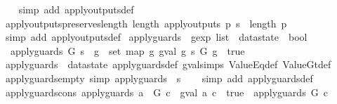 \begin{isabellebody}
%
\isadelimproof
\ \ %
\endisadelimproof
%
\isatagproof
{}\isamarkupfalse%
\ {\isacharparenleft}simp\ add{\isacharcolon}\ apply{\isacharunderscore}outputs{\isacharunderscore}def{\isacharparenright}%
\endisatagproof
{\isafoldproof}%
%
\isadelimproof
\isanewline
%
\endisadelimproof
\isanewline
{}\isamarkupfalse%
\ apply{\isacharunderscore}outputs{\isacharunderscore}preserves{\isacharunderscore}length{\isacharcolon}\ {\isachardoublequoteopen}length\ {\isacharparenleft}apply{\isacharunderscore}outputs\ p\ s{\isacharparenright}\ {\isacharequal}\ length\ p{\isachardoublequoteclose}\isanewline
%
\isadelimproof
\ \ %
\endisadelimproof
%
\isatagproof
{}\isamarkupfalse%
\ {\isacharparenleft}simp\ add{\isacharcolon}\ apply{\isacharunderscore}outputs{\isacharunderscore}def{\isacharparenright}%
\endisatagproof
{\isafoldproof}%
%
\isadelimproof
\isanewline
%
\endisadelimproof
\isanewline
{}\isamarkupfalse%
\ apply{\isacharunderscore}guards\ {\isacharcolon}{\isacharcolon}\ {\isachardoublequoteopen}gexp\ list\ {\isasymRightarrow}\ datastate\ {\isasymRightarrow}\ bool{\isachardoublequoteclose}\ \isanewline
\ \ {\isachardoublequoteopen}apply{\isacharunderscore}guards\ G\ s\ {\isacharequal}\ {\isacharparenleft}{\isasymforall}g\ {\isasymin}\ set\ {\isacharparenleft}map\ {\isacharparenleft}{\isasymlambda}g{\isachardot}\ gval\ g\ s{\isacharparenright}\ G{\isacharparenright}{\isachardot}\ g\ {\isacharequal}\ true{\isacharparenright}{\isachardoublequoteclose}\isanewline
\isanewline
{}\isamarkupfalse%
\ apply{\isacharunderscore}guards\ {\isacharequal}\ datastate\ apply{\isacharunderscore}guards{\isacharunderscore}def\ gval{\isachardot}simps\ ValueEq{\isacharunderscore}def\ ValueGt{\isacharunderscore}def\isanewline
\isanewline
{}\isamarkupfalse%
\ apply{\isacharunderscore}guards{\isacharunderscore}empty\ {\isacharbrackleft}simp{\isacharbrackright}{\isacharcolon}\ {\isachardoublequoteopen}apply{\isacharunderscore}guards\ {\isacharbrackleft}{\isacharbrackright}\ s{\isachardoublequoteclose}\isanewline
%
\isadelimproof
\ \ %
\endisadelimproof
%
\isatagproof
{}\isamarkupfalse%
\ {\isacharparenleft}simp\ add{\isacharcolon}\ apply{\isacharunderscore}guards{\isacharunderscore}def{\isacharparenright}%
\endisatagproof
{\isafoldproof}%
%
\isadelimproof
\isanewline
%
\endisadelimproof
\isanewline
{}\isamarkupfalse%
\ apply{\isacharunderscore}guards{\isacharunderscore}cons{\isacharcolon}\ {\isachardoublequoteopen}apply{\isacharunderscore}guards\ {\isacharparenleft}a\ {\isacharhash}\ G{\isacharparenright}\ c\ {\isacharequal}\ {\isacharparenleft}gval\ a\ c\ {\isacharequal}\ true\ {\isasymand}\ apply{\isacharunderscore}guards\ G\ c{\isacharparenright}{\isachardoublequoteclose}\isanewline

\end{isabellebody}
